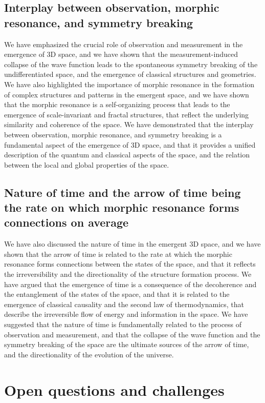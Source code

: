 \subsection{Interplay between observation, morphic resonance, and symmetry breaking}
We have emphasized the crucial role of observation and measurement in the emergence of 3D space, and we have shown that the measurement-induced collapse of the wave function leads to the spontaneous symmetry breaking of the undifferentiated space, and the emergence of classical structures and geometries. We have also highlighted the importance of morphic resonance in the formation of complex structures and patterns in the emergent space, and we have shown that the morphic resonance is a self-organizing process that leads to the emergence of scale-invariant and fractal structures, that reflect the underlying similarity and coherence of the space. We have demonstrated that the interplay between observation, morphic resonance, and symmetry breaking is a fundamental aspect of the emergence of 3D space, and that it provides a unified description of the quantum and classical aspects of the space, and the relation between the local and global properties of the space.

\subsection{Nature of time and the arrow of time being the rate on which morphic resonance forms connections on average}
We have also discussed the nature of time in the emergent 3D space, and we have shown that the arrow of time is related to the rate at which the morphic resonance forms connections between the states of the space, and that it reflects the irreversibility and the directionality of the structure formation process. We have argued that the emergence of time is a consequence of the decoherence and the entanglement of the states of the space, and that it is related to the emergence of classical causality and the second law of thermodynamics, that describe the irreversible flow of energy and information in the space. We have suggested that the nature of time is fundamentally related to the process of observation and measurement, and that the collapse of the wave function and the symmetry breaking of the space are the ultimate sources of the arrow of time, and the directionality of the evolution of the universe.

\section{Open questions and challenges}

